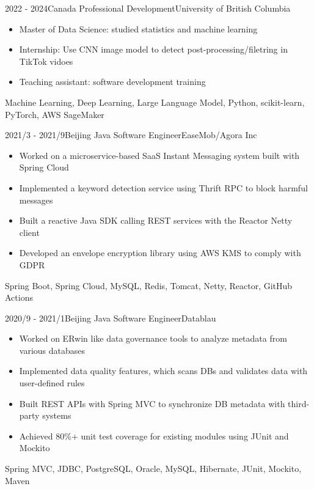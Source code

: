 \documentclass[localFont,alternative]{resume_template}
\begin{document}
    \begin{experiences}

    \experience
    {2022 - 2024}{Canada}
    {Professional Development}{University of British Columbia}
    {
        \begin{itemize}
        \item Master of Data Science: studied statistics and machine learning
        \item Internship: Use CNN image model to detect post-processing/filetring in TikTok vidoes
        \item Teaching assistant: software development training
        \end{itemize}
    }
    {Machine Learning, Deep Learning, Large Language Model, Python, scikit-learn, PyTorch, AWS SageMaker}

    \emptySeparator

    \experience
    {2021/3 - 2021/9}{Beijing}
    {Java Software Engineer}{EaseMob/Agora Inc}
    {
        \begin{itemize}
        \item Worked on a microservice-based SaaS Instant Messaging system built with Spring Cloud
        \item Implemented a keyword detection service using Thrift RPC to block harmful messages
        \item Built a reactive Java SDK calling REST services with the Reactor Netty client
        \item Developed an envelope encryption library using AWS KMS to comply with GDPR
        \end{itemize}
    }
    {Spring Boot, Spring Cloud, MySQL, Redis, Tomcat, Netty, Reactor, GitHub Actions}

    \emptySeparator

    \experience
    {2020/9 - 2021/1}{Beijing}
    {Java Software Engineer}{Datablau}
    {
        \begin{itemize}
        \item Worked on ERwin like data governance tools to analyze metadata from various databases
        \item Implemented data quality features, which scans DBs and validates data with user-defined rules
        \item Built REST APIs with Spring MVC to synchronize DB metadata with third-party systems
        \item Achieved 80\%+ unit test coverage for existing modules using JUnit and Mockito
        \end{itemize}
    }
    {Spring MVC, JDBC, PostgreSQL, Oracle, MySQL, Hibernate, JUnit, Mockito, Maven}


\end{experiences}
\end{document}
